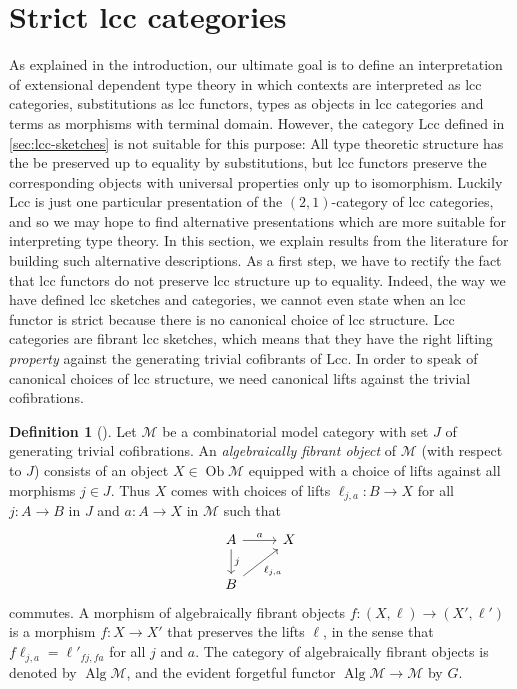 \documentclass{article}
\theoremstyle{remark}
\theoremstyle{definition}
\newtheorem{definition}{Definition}
\begin{document}
\section{Strict lcc categories}
\label{sec:strict-lcc-categories}

As explained in the introduction, our ultimate goal is to define an interpretation of extensional dependent type theory in which contexts are interpreted as lcc categories, substitutions as lcc functors, types as objects in lcc categories and terms as morphisms with terminal domain.
However, the category $\mathrm{Lcc}$ defined in \ref{sec:lcc-sketches} is not suitable for this purpose:
All type theoretic structure has the be preserved up to equality by substitutions, but lcc functors preserve the corresponding objects with universal properties only up to isomorphism.
Luckily $\mathrm{Lcc}$ is just one particular presentation of the $(2, 1)$-category of lcc categories, and so we may hope to find alternative presentations which are more suitable for interpreting type theory.
In this section, we explain results from the literature for building such alternative descriptions.
As a first step, we have to rectify the fact that lcc functors do not preserve lcc structure up to equality.
Indeed, the way we have defined lcc sketches and categories, we cannot even state when an lcc functor is strict because there is no canonical choice of lcc structure.
Lcc categories are fibrant lcc sketches, which means that they have the right lifting \emph{property} against the generating trivial cofibrants of $\mathrm{Lcc}$.
In order to speak of canonical choices of lcc structure, we need canonical lifts against the trivial cofibrations.

\begin{definition}[\cite{algebraic-models}]
  Let $\mathcal{M}$ be a combinatorial model category with set $J$ of generating trivial cofibrations.
  An \emph{algebraically fibrant object} of $\mathcal{M}$ (with respect to $J$) consists of an object $X \in \operatorname{Ob} \mathcal{M}$ equipped with a choice of lifts against all morphisms $j \in J$.
  Thus $X$ comes with choices of lifts $\ell_{j, a} : B \rightarrow X$ for all $j : A \rightarrow B$ in $J$ and $a : A \rightarrow X$ in $\mathcal{M}$ such that
  \begin{equation}
    \begin{tikzcd}
      A \arrow[d, "j"] \arrow[r, "a"] & X \\
      B \arrow[ur, "{\ell_{j, a}}"']
    \end{tikzcd}
  \end{equation}
  commutes.
  A morphism of algebraically fibrant objects $f : (X, \ell) \rightarrow (X', \ell')$ is a morphism $f : X \rightarrow X'$ that preserves the lifts $\ell$, in the sense that $f\ell_{j, a} = \ell'_{fj, fa}$ for all $j$ and $a$.
  The category of algebraically fibrant objects is denoted by $\operatorname{Alg} \mathcal{M}$, and the evident forgetful functor $\operatorname{Alg} \mathcal{M} \rightarrow \mathcal{M}$ by $G$.
\end{definition}
\end{document}
